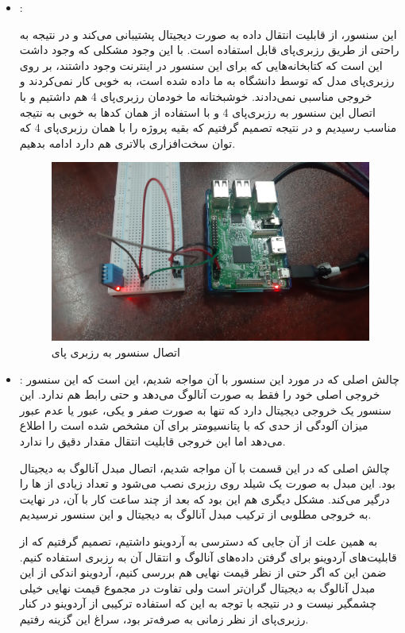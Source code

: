 \documentclass[12pt]{article}
\begin{document}
\begin{itemize}
	\item {}:
	
	این سنسور،‌ از قابلیت انتقال داده به صورت دیجیتال پشتیبانی می‌کند و در نتیجه به راحتی از طریق رزبری‌پای قابل استفاده است. با این وجود مشکلی که وجود داشت این است که کتابخانه‌هایی که برای این سنسور در اینترنت وجود داشتند،‌ بر روی رزبری‌پای مدل  که توسط دانشگاه به ما داده شده است، به خوبی کار نمی‌کردند و خروجی مناسبی نمی‌دادند. خوشبختانه ما خودمان رزبری‌پای 4 هم داشتیم و با اتصال این سنسور به رزبری‌پای 4 و با استفاده از همان کدها به خوبی به نتیجه مناسب رسیدیم و در نتیجه تصمیم گرفتیم که بقیه پروژه را با همان رزبری‌پای 4 که توان سخت‌افزاری بالاتری هم دارد ادامه بدهیم.
	\begin{figure}[H]
		\begin{center}
			\includegraphics[width=.70\textwidth]{images/dht11.jpg}
		\end{center}
		\caption{اتصال سنسور   به رزبری پای}
	\end{figure}
	
	\item {}:
	چالش اصلی که در مورد این سنسور با آن مواجه شدیم، این است که این سنسور خروجی اصلی خود را فقط به صورت آنالوگ می‌دهد و حتی رابط  هم ندارد. این سنسور یک خروجی دیجیتال دارد که تنها به صورت صفر و یکی، عبور یا عدم عبور میزان آلودگی از حدی که با پتانسیومتر برای آن مشخص شده است را اطلاع می‌دهد اما این خروجی قابلیت انتقال مقدار دقیق را ندارد.
	
	چالش اصلی که در این قسمت با آن مواجه شدیم، اتصال مبدل آنالوگ به دیجیتال بود. این مبدل به صورت یک شیلد روی رزبری نصب می‌شود و تعداد زیادی از  ‌ها را درگیر می‌کند. مشکل دیگری هم این بود که بعد از چند ساعت کار با آن، در نهایت به خروجی مطلوبی از ترکیب مبدل آنالوگ به دیجیتال و این سنسور نرسیدیم.
	
	به همین علت از آن جایی که دسترسی به آردوینو  داشتیم، تصمیم گرفتیم که از قابلیت‌های آردوینو برای گرفتن داده‌های آنالوگ و انتقال آن به رزبری استفاده کنیم. ضمن این که اگر حتی از نظر قیمت‌ نهایی هم بررسی کنیم، آردوینو اندکی از این مبدل آنالوگ به دیجیتال گران‌تر است ولی تفاوت در مجموع قیمت نهایی خیلی چشمگیر نیست و در نتیجه با توجه به این که استفاده ترکیبی از آردوینو در کنار رزبری‌پای از نظر زمانی به صرفه‌تر بود، سراغ این گزینه رفتیم.
	

\end{itemize}
\end{document}
